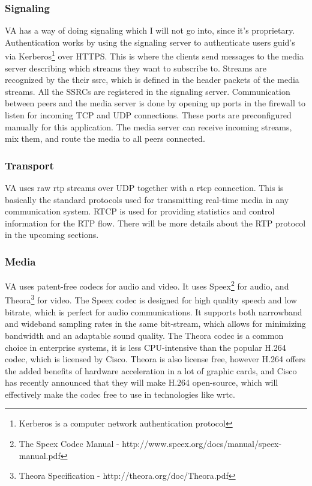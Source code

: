 \subsubsection{Signaling}
VA has a way of doing signaling which I will not go into, since it's proprietary. Authentication works by using the signaling server to authenticate users \gls{guid}'s via Kerberos\footnote{Kerberos is a computer network authentication protocol} over HTTPS. This is where the clients send messages to the media server describing which streams they want to subscribe to. Streams are recognized by the their \gls{ssrc}, which is defined in the header packets of the media streams. All the SSRCs are registered in the signaling server. Communication between peers and the media server is done by opening up ports in the firewall to listen for incoming TCP and UDP connections. These ports are preconfigured manually for this application. The media server can receive incoming streams, mix them, and route the media to all peers connected.

\subsubsection{Transport}
VA uses raw \gls{rtp} streams over UDP together with a \gls{rtcp} connection. This is basically the standard protocols used for transmitting real-time media in any communication system. RTCP is used for providing statistics and control information for the RTP flow. There will be more details about the RTP protocol in the upcoming sections.

\subsubsection{Media}
VA uses patent-free codecs for audio and video. It uses Speex\footnote{The Speex Codec Manual - http://www.speex.org/docs/manual/speex-manual.pdf} for audio, and Theora\footnote{Theora Specification - http://theora.org/doc/Theora.pdf} for video. The Speex codec is designed for high quality speech and low bitrate, which is perfect for audio communications. It supports both narrowband and wideband sampling rates in the same bit-stream\cite{speex}, which allows for minimizing bandwidth and an adaptable sound quality. The Theora codec is a common choice in enterprise systems, it is less CPU-intensive than the popular H.264 codec\cite{theora}, which is licensed by Cisco. Theora is also license free, however H.264 offers the added benefits of hardware acceleration in a lot of graphic cards, and Cisco has recently announced that they will make H.264 open-source\cite{h264-free}, which will effectively make the codec free to use in technologies like \gls{wrtc}.

